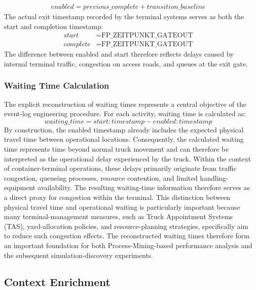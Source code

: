 \begin{align} enabled = previous\_complete + transition\_baseline \end{align} The actual exit timestamp recorded by the terminal systems serves as both the start and completion timestamp: \begin{align} start &= \text{FP\_ZEITPUNKT\_GATEOUT} \\ complete &= \text{FP\_ZEITPUNKT\_GATEOUT} \end{align} The difference between enabled and start therefore reflects delays caused by internal terminal traffic, congestion on access roads, and queues at the exit gate.
        
        \subsubsection{Waiting Time Calculation} 
        The explicit reconstruction of waiting times represents a central objective of the event-log engineering procedure. For each activity, waiting time is calculated as: 
        \begin{equation} waiting\_time = start:timestamp - enabled:timestamp \end{equation}
        By construction, the enabled timestamp already includes the expected physical travel time between operational locations. Consequently, the calculated waiting time represents time beyond normal truck movement and can therefore be interpreted as the operational delay experienced by the truck. Within the context of container-terminal operations, these delays primarily originate from traffic congestion, queueing processes, resource contention, and limited handling-equipment availability. The resulting waiting-time information therefore serves as a direct proxy for congestion within the terminal. This distinction between physical travel time and operational waiting is particularly important because many terminal-management measures, such as Truck Appointment Systems (TAS), yard-allocation policies, and resource-planning strategies, specifically aim to reduce such congestion effects. The reconstructed waiting times therefore form an important foundation for both Process-Mining-based performance analysis and the subsequent simulation-discovery experiments.
    
        
        
    \subsection{Context Enrichment}

